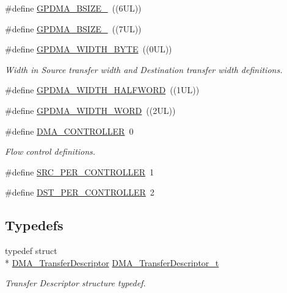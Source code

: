 \begin{DoxyCompactItemize}
\#define \hyperlink{group__GPDMA__17XX__40XX_ga808a32404cd29d656eb9ee31dacacdbb}{G\-P\-D\-M\-A\-\_\-\-B\-S\-I\-Z\-E\-\_}~((6\-U\-L))
\item 
\#define \hyperlink{group__GPDMA__17XX__40XX_gad11cb83bebe2dc426f62cded244ea391}{G\-P\-D\-M\-A\-\_\-\-B\-S\-I\-Z\-E\-\_}~((7\-U\-L))
\item 
\#define \hyperlink{group__GPDMA__17XX__40XX_gacc6deb5ab0e06eded3cdd151754db8f0}{G\-P\-D\-M\-A\-\_\-\-W\-I\-D\-T\-H\-\_\-\-B\-Y\-T\-E}~((0\-U\-L))
\begin{DoxyCompactList}\small\item\em Width in Source transfer width and Destination transfer width definitions. \end{DoxyCompactList}\item 
\#define \hyperlink{group__GPDMA__17XX__40XX_gab28fc48561886a87a1c87eeb7078ef8b}{G\-P\-D\-M\-A\-\_\-\-W\-I\-D\-T\-H\-\_\-\-H\-A\-L\-F\-W\-O\-R\-D}~((1\-U\-L))
\item 
\#define \hyperlink{group__GPDMA__17XX__40XX_gad611897f330a6ec01b0699b244b132bb}{G\-P\-D\-M\-A\-\_\-\-W\-I\-D\-T\-H\-\_\-\-W\-O\-R\-D}~((2\-U\-L))
\item 
\#define \hyperlink{group__GPDMA__17XX__40XX_ga42385ba8b249b55d8a140a7c35f41c35}{D\-M\-A\-\_\-\-C\-O\-N\-T\-R\-O\-L\-L\-E\-R}~0
\begin{DoxyCompactList}\small\item\em Flow control definitions. \end{DoxyCompactList}\item 
\#define \hyperlink{group__GPDMA__17XX__40XX_ga850a296f501c6a30228f8df251b73767}{S\-R\-C\-\_\-\-P\-E\-R\-\_\-\-C\-O\-N\-T\-R\-O\-L\-L\-E\-R}~1
\item 
\#define \hyperlink{group__GPDMA__17XX__40XX_ga09bdacfb969a90a403f99d379c34638c}{D\-S\-T\-\_\-\-P\-E\-R\-\_\-\-C\-O\-N\-T\-R\-O\-L\-L\-E\-R}~2
\end{DoxyCompactItemize}
\subsection*{Typedefs}
\begin{DoxyCompactItemize}
\item 
typedef struct \\*
\hyperlink{structDMA__TransferDescriptor}{D\-M\-A\-\_\-\-Transfer\-Descriptor} \hyperlink{group__GPDMA__17XX__40XX_ga23dbdf610f0d1f61ae30a69944bbee55}{D\-M\-A\-\_\-\-Transfer\-Descriptor\-\_\-t}
\begin{DoxyCompactList}\small\item\em Transfer Descriptor structure typedef. \end{DoxyCompactList}\end{DoxyCompactItemize}
